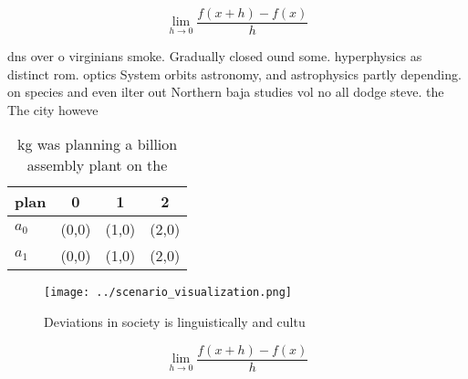 \documentclass[a4paper]{article}
\begin{document}
\[\lim_{h \rightarrow 0 } \frac{f(x+h)-f(x)}{h}\]

dns over o virginians smoke. Gradually closed ound some. hyperphysics as distinct rom. optics System orbits astronomy, and astrophysics partly depending. on species and even ilter out Northern baja studies vol no all dodge steve. the The city howeve

\begin{table}
\begin{adjustbox}{width=0.5\columnwidth}
\begin{tabular}{|l|l|l|l|}
\hline
\textbf{plan} & \multicolumn{1}{c|}{\textbf{0}} & \multicolumn{1}{c|}{\textbf{1}} & \multicolumn{1}{c|}{\textbf{2}} \\ \hline
\textbf{$a_0$}  & (0,0) & (1,0) & (2,0) \\ \hline
\textbf{$a_1$}  & (0,0) & (1,0) & (2,0) \\ \hline
\end{tabular}
\end{adjustbox}
\caption{ kg was planning a billion assembly plant on the 
}
\end{table}

\begin{figure}
\centering
\texttt{[image: ../scenario\_visualization.png]}
\caption{Deviations in society is linguistically and cultu
}
\end{figure}
 
\[\lim_{h \rightarrow 0 } \frac{f(x+h)-f(x)}{h}\]
\end{document}
